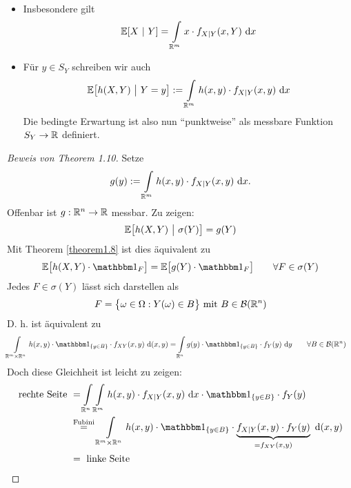 \begin{bemerkung}\
\begin{itemize}
\item Insbesondere gilt
\begin{align*}
\mathbb{E}[X~|~Y]=\int\limits_{\mathbb{R}^m} x\cdot f_{X|Y}(x,Y)\text{ d} x
\end{align*}
\item Für $y\in S_Y$ schreiben wir auch
\begin{align*}
\mathbb{E}\big[h(X,Y)~\big|~Y=y\big]:=\int\limits_{\mathbb{R}^m} h(x,y)\cdot f_{X|Y}(x,y)\text{ d} x
\end{align*}
Die bedingte Erwartung ist also nun ``punktweise''  als messbare Funktion $S_Y\to\mathbb{R}$ definiert.
\end{itemize}
\end{bemerkung}
\begin{proof}[Beweis von Theorem 1.10]
Setze
\begin{align*}
g(y):=\int\limits_{\mathbb{R}^m} h(x,y)\cdot f_{X|Y}(x,y)\text{ d} x.
\end{align*}
Offenbar ist $g:\mathbb{R}^n\to\mathbb{R}$ messbar. Zu zeigen:
\begin{align*}
	\mathbb{E}\big[h(X,Y)~\big|~\sigma(Y)\big]=g(Y)
\end{align*}
Mit Theorem \ref{theorem1.8} ist dies äquivalent zu
\begin{align*}
\E\big[ h(X,Y)\cdot\indi_F\big]=\E\big[g(Y)\cdot\indi_F\big]\qquad\forall F\in\sigma(Y)
\end{align*}
Jedes $F\in\sigma(Y)$ lässt sich darstellen als 
\begin{align*}
F=\big\lbrace\omega\in\Omega:Y(\omega)\in B\big\rbrace\text{ mit } B\in\mathcal{B}(\mathbb{R}^n)
\end{align*}
D. h. ist äquivalent zu
\begin{align*}
\int\limits_{\R^m\times\R^n} h(x,y)\cdot\indi_{\lbrace y\in B\rbrace}\cdot f_{XY}(x,y)\d (x,y)
&=
\int\limits_{\R^n} g(y)\cdot\indi_{\lbrace y\in B\rbrace}\cdot f_Y(y)\d y\qquad\forall B\in\B(\R^n)
\end{align*}
Doch diese Gleichheit ist leicht zu zeigen:
\begin{align*}
\text{rechte Seite }&=\int\limits_{\R^n}\int\limits_{\R^m} h(x,y)\cdot f_{X|Y}(x,y)\d x\cdot\indi_{\lbrace y\in B\rbrace} \cdot f_Y(y)\\
&\stackeq{\text{Fubini}}
\int\limits_{\R^m\times\R^n} h(x,y)\cdot\indi_{\lbrace y\in B\rbrace}\cdot\underbrace{f_{X|Y}(x,y)\cdot f_Y(y)}_{=f_{XY}(x,y)}\d (x,y)\\
&=\text{ linke Seite}
\end{align*}
\end{proof}

